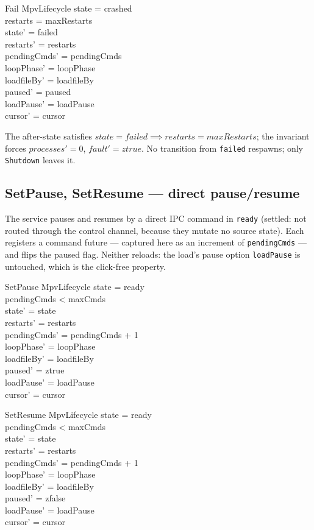 \documentclass[a4paper,10pt,fleqn]{article}
\begin{document}
\begin{schema}{Fail}
  \Delta MpvLifecycle
  \where
  state = crashed \\
  restarts = maxRestarts \\
  state' = failed \\
  restarts' = restarts \\
  pendingCmds' = pendingCmds \\
  loopPhase' = loopPhase \\
  loadfileBy' = loadfileBy \\
  paused' = paused \\
  loadPause' = loadPause \\
  cursor' = cursor
\end{schema}

The after-state satisfies $state = failed \implies restarts = maxRestarts$; the
invariant forces $processes' = 0$, $fault' = ztrue$. No transition from
\texttt{failed} respawns; only \texttt{Shutdown} leaves it.

\subsection{SetPause, SetResume --- direct pause/resume}
\label{sec:pause}

The service pauses and resumes by a direct IPC command in \texttt{ready}
(settled: not routed through the control channel, because they mutate no source
state). Each registers a command future --- captured here as an increment of
\texttt{pendingCmds} --- and flips the paused flag. Neither reloads: the load's
pause option \texttt{loadPause} is untouched, which is the click-free property.

\begin{schema}{SetPause}
  \Delta MpvLifecycle
  \where
  state = ready \\
  pendingCmds < maxCmds \\
  state' = state \\
  restarts' = restarts \\
  pendingCmds' = pendingCmds + 1 \\
  loopPhase' = loopPhase \\
  loadfileBy' = loadfileBy \\
  paused' = ztrue \\
  loadPause' = loadPause \\
  cursor' = cursor
\end{schema}

\begin{schema}{SetResume}
  \Delta MpvLifecycle
  \where
  state = ready \\
  pendingCmds < maxCmds \\
  state' = state \\
  restarts' = restarts \\
  pendingCmds' = pendingCmds + 1 \\
  loopPhase' = loopPhase \\
  loadfileBy' = loadfileBy \\
  paused' = zfalse \\
  loadPause' = loadPause \\
  cursor' = cursor
\end{schema}
\end{document}
